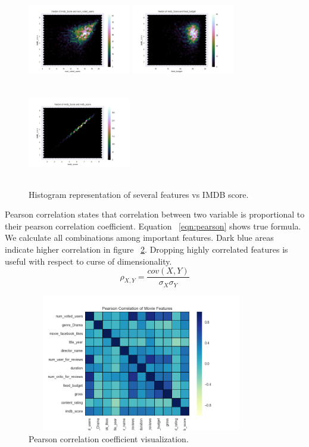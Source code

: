 \documentclass{article}
\begin{document}
\begin{figure}[H]
  \centering
  \includegraphics[width=4.5cm, height=4cm]{num_voted_users}
  \includegraphics[width=4.5cm, height=4cm]{budget}
  \includegraphics[width=4.5cm, height=4cm]{imdb_score}
  \caption{Histogram representation of several features vs IMDB score.}
  \label{hexbin_figures}
\end{figure}

Pearson correlation states that correlation between two variable is proportional to their pearson correlation coefficient. Equation ~\ref{eqn:pearson} shows true formula. We calculate all combinations among important features. Dark blue areas indicate higher correlation in figure ~\ref{fig:pearson}. Dropping highly correlated features is useful with respect to curse of dimensionality.
\begin{equation}
	\rho_{X,Y} = \frac{cov(X,Y)}{\sigma_X\sigma_Y}
    \label{eqn:pearson}
\end{equation}

\begin{figure}[H]
	\centering
    \includegraphics[width=10cm, height=6cm]{pearson}
    \caption{Pearson correlation coefficient visualization.}
    \label{fig:pearson}
\end{figure}
\end{document}
